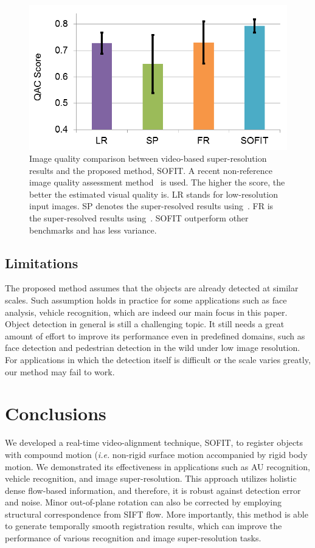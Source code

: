 \documentclass[10pt,journal]{IEEEtran}
\begin{document}
\begin{figure}[t]
	\centering
		\includegraphics[width=.8\columnwidth]{fig/SR_quant.png}
	\caption{Image quality comparison between video-based super-resolution results and the proposed method, SOFIT. A recent non-reference image quality assessment method~\cite{Xue_CVPR13} is used. The higher the score, the better the estimated visual quality is. LR stands for low-resolution input images. SP denotes the super-resolved results using~\cite{Keren_CVPR88}. FR is the super-resolved results using~\cite{Vandewalle06}. SOFIT outperform other benchmarks and has less variance. }
	\label{fig:SR_quant}
\end{figure}

\subsection{Limitations}
The proposed method assumes that the objects are already detected at similar scales. Such assumption holds in practice for some applications such as face analysis, vehicle recognition, which are indeed our main focus in this paper. Object detection in general is still a challenging topic. It still needs a great amount of effort to improve its performance even in predefined domains, such as face detection and pedestrian detection in the wild under low image resolution. For applications in which the detection itself is difficult or the scale varies greatly, our method may fail to work.


\section{Conclusions\label{sec:conclusion}}

We developed a real-time video-alignment technique, SOFIT, to register objects with compound motion (\textit{i.e.} non-rigid surface motion accompanied by rigid body motion. We demonstrated its effectiveness in applications such as AU recognition, vehicle recognition, and image super-resolution. This approach utilizes holistic dense flow-based information, and therefore, it is robust against detection error and noise. Minor out-of-plane rotation can also be corrected by employing structural correspondence from SIFT flow. More importantly, this method is able to generate temporally smooth registration results, which can improve the performance of various recognition and image super-resolution tasks.
\end{document}
